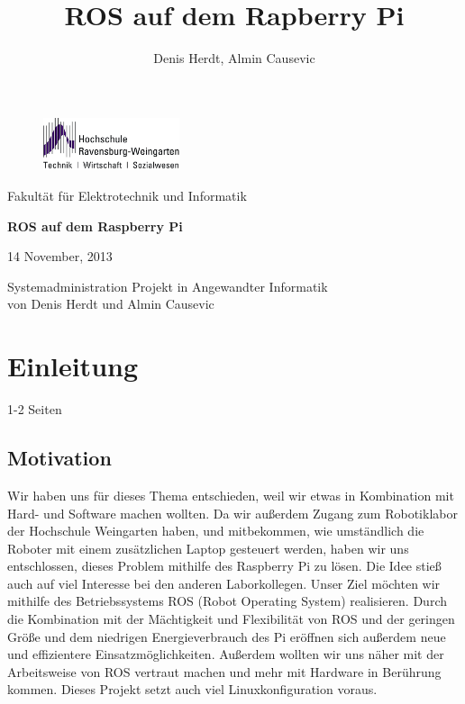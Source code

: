 \documentclass[12pt]{article}
\author{Denis Herdt, Almin Causevic}
\title{ROS auf dem Rapberry Pi}
\begin{document}
\begin{figure}[h]

\includegraphics[width=4cm]{hs-logo.jpg}
\end{figure}
Fakultät für Elektrotechnik und Informatik

\vspace{3cm}

\begin{center}

{\bf \huge ROS auf dem Raspberry Pi}
\vspace{4cm}

14 November, 2013
\vspace{1cm}

Systemadministration Projekt in Angewandter Informatik \\
von Denis Herdt und Almin Causevic

\end{center}

\pagebreak

\tableofcontents

\pagebreak

\section{Einleitung}
1-2 Seiten
\subsection{Motivation}


Wir haben uns für dieses Thema entschieden, weil wir etwas in Kombination mit Hard- und Software machen wollten. Da wir außerdem Zugang zum Robotiklabor der Hochschule Weingarten haben, und mitbekommen, wie umständlich die Roboter mit einem zusätzlichen Laptop gesteuert werden, haben wir uns entschlossen, dieses Problem mithilfe des Raspberry Pi zu lösen. Die Idee stieß auch auf viel Interesse bei den anderen Laborkollegen.
Unser Ziel möchten wir mithilfe des Betriebssystems ROS (Robot Operating System) realisieren.
Durch die Kombination mit der Mächtigkeit und Flexibilität von ROS und der geringen Größe und dem niedrigen Energieverbrauch des Pi eröffnen sich außerdem neue und effizientere Einsatzmöglichkeiten.
Außerdem wollten wir uns näher mit der Arbeitsweise von ROS vertraut machen und mehr mit Hardware in Berührung kommen. Dieses Projekt setzt auch viel Linuxkonfiguration voraus.
\end{document}
